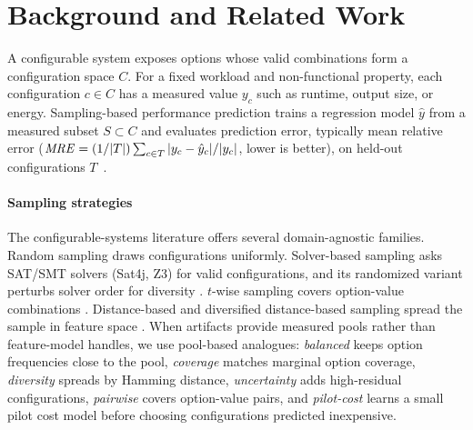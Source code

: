 \section{Background and Related Work}
\label{sec:background}
\label{sec:related_work}

A configurable system exposes options whose valid combinations form a configuration space $C$. For a fixed workload and non-functional property, each
configuration $c\in C$ has a measured value $y_c$ such as runtime, output size,
or energy. Sampling-based performance prediction trains a regression model
$\hat y$ from a measured subset $S\subset C$ and evaluates prediction error,
typically mean relative error
($\mathit{MRE}=(1/|T|)\sum_{c\in T}|y_c-\hat y_c|/|y_c|$, lower is better), on
held-out configurations $T$~\cite{siegmund2015FSE,kaltenecker2019,pereira2020,julianasurvey}.

\paragraph*{Sampling strategies}
The configurable-systems literature offers several domain-agnostic families.
Random sampling draws configurations uniformly. Solver-based sampling asks
SAT/SMT solvers (Sat4j, Z3) for valid configurations, and its randomized variant
perturbs solver order for diversity \cite{DBLP:journals/tse/HenardPPKHT14}.
$t$-wise sampling covers option-value combinations
\cite{Kuhn2004,Cohen2008,Johansen2012}. Distance-based and diversified
distance-based sampling spread the sample in feature space \cite{kaltenecker2019}.
When artifacts provide measured pools rather than feature-model handles, we use
pool-based analogues: \emph{balanced} keeps option frequencies close to the pool,
\emph{coverage} matches marginal option coverage, \emph{diversity} spreads by
Hamming distance, \emph{uncertainty} adds high-residual configurations,
\emph{pairwise} covers option-value pairs, and \emph{pilot-cost} learns a small
pilot cost model before choosing configurations predicted inexpensive.

